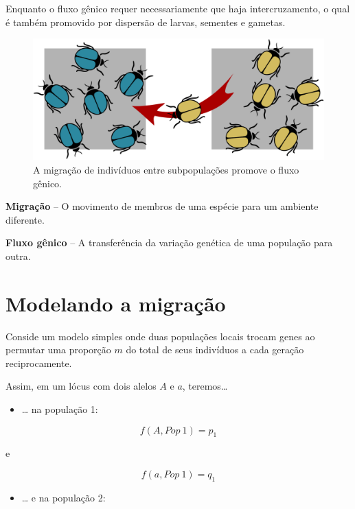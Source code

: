 \documentclass[
]{book}
\providecommand{\tightlist}{%
  \setlength{\itemsep}{0pt}\setlength{\parskip}{0pt}}
\begin{document}
Enquanto o fluxo gênico requer necessariamente que haja intercruzamento, o qual é também promovido por dispersão de larvas, sementes e gametas.

\begin{figure}

{\centering \includegraphics[width=600px]{figs/migration_bettles} 

}

\caption{A migração de indivíduos entre subpopulações promove o fluxo gênico.}\label{fig:bettlemigration}
\end{figure}

\textbf{Migração} -- O movimento de membros de uma espécie para um ambiente diferente.

\textbf{Fluxo gênico} -- A transferência da variação genética de uma população para outra.

\hypertarget{modelando-a-migrauxe7uxe3o}{%
\section{Modelando a migração}\label{modelando-a-migrauxe7uxe3o}}

Conside um modelo simples onde duas populações locais trocam genes ao permutar uma proporção \(m\) do total de seus indivíduos a cada geração reciprocamente.

Assim, em um lócus com dois alelos \(A\) e \(a\), teremos\ldots{}

\begin{itemize}
\tightlist
\item
  \ldots{} na população 1:
\end{itemize}

\[f(A,Pop\ 1) = p_1\]

e

\[f(a,Pop\ 1) = q_1\]

\begin{itemize}
\tightlist
\item
  \ldots{} e na população 2:
\end{itemize}
\end{document}
